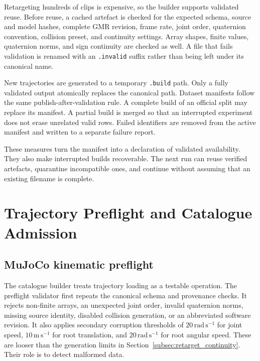 Retargeting hundreds of clips is expensive, so the builder supports validated
reuse. Before reuse, a cached artefact is checked for the expected schema,
source and model hashes, complete GMR revision, frame rate, joint order,
quaternion convention, collision preset, and continuity settings. Array shapes,
finite values, quaternion norms, and sign continuity are checked as well. A
file that fails validation is renamed with an \texttt{.invalid} suffix rather
than being left under its canonical name.

New trajectories are generated to a temporary \texttt{.build} path. Only a
fully validated output atomically replaces the canonical path. Dataset
manifests follow the same publish-after-validation rule. A complete build of an
official split may replace its manifest. A partial build is merged so that an
interrupted experiment does not erase unrelated valid rows. Failed identifiers
are removed from the active manifest and written to a separate failure report.

These measures turn the manifest into a declaration of validated availability.
They also make interrupted builds recoverable. The
next run can reuse verified artefacts, quarantine incompatible ones, and
continue without assuming that an existing filename is complete.

\section{Trajectory Preflight and Catalogue Admission}
\label{sec:preflight_admission}

\subsection{MuJoCo kinematic preflight}
\label{subsec:mujoco_preflight}

The catalogue builder treats trajectory loading as a testable operation. The
preflight validator first repeats the canonical schema and provenance checks.
It rejects non-finite arrays, an unexpected joint order, invalid quaternion
norms, missing source identity, disabled collision generation, or an abbreviated
software revision. It also applies secondary corruption thresholds of
$20\,\mathrm{rad\,s^{-1}}$ for joint speed, $10\,\mathrm{m\,s^{-1}}$ for root
translation, and $20\,\mathrm{rad\,s^{-1}}$ for root angular speed. These are
looser than the generation limits in Section~\ref{subsec:retarget_continuity}.
Their role is to detect malformed data.

